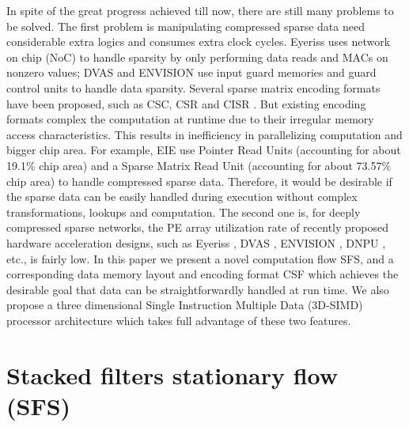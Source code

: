 \documentclass{article} %
\begin{document}
In spite of the great progress achieved till now, there are still many problems to be solved. The first problem is manipulating compressed sparse data need considerable extra logics and consumes extra clock cycles. Eyeriss\citep{Chen2017Eyeriss} uses network on chip (NoC) to handle sparsity by only performing data reads and MACs on nonzero values; DVAS\citep{Moons2015DVAS} and ENVISION\citep{Moons201714} use input guard memories and guard control units to handle data sparsity. Several sparse matrix encoding formats have been proposed, such as CSC, CSR and CISR \citep{Fowers2014A}. But existing encoding formats complex the computation at runtime due to their irregular memory access characteristics. This results in inefficiency in parallelizing computation and bigger chip area. For example, EIE\citep{han2016eie} use Pointer Read Units (accounting for about 19.1\% chip area) and a Sparse Matrix Read Unit (accounting for about 73.57\% chip area) to handle compressed sparse data. Therefore, it would be desirable if the sparse data can be easily handled during execution without complex transformations, lookups and computation. The second one is, for deeply compressed sparse networks, the PE array utilization rate of recently proposed hardware acceleration designs, such as Eyeriss \citep{Chen2017Eyeriss}, DVAS \citep{Moons2015DVAS}, ENVISION \citep{Moons201714}, DNPU \citep{Shin201714}, etc., is fairly low. In this paper we present a novel computation flow SFS, and a corresponding data memory layout and encoding format CSF which achieves the desirable goal that data can be straightforwardly handled at run time. We also propose a three dimensional Single Instruction Multiple Data (3D-SIMD) processor architecture which takes full advantage of these two features.

\section{Stacked filters stationary flow (SFS)}
\end{document}
